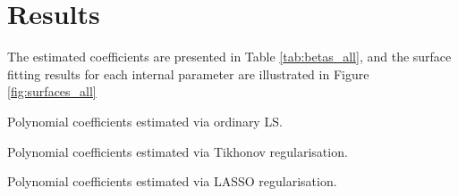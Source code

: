 \documentclass[a4paper,11pt,twoside]{article}
\def\dataset{C}
\theoremstyle{mytheoremstyle}
\begin{document}
\section{Results}
The estimated coefficients are presented in Table \ref{tab:betas_all}, and the surface fitting results for each internal parameter are illustrated in Figure \ref{fig:surfaces_all}

\begin{table}[!h]
	\centering
	\caption{Polynomial coefficients estimated via ordinary LS.}\label{tab:betas_all}
	\small
	
\end{table} 
\begin{table}[!h]
	\centering
	\caption{Polynomial coefficients estimated via Tikhonov regularisation.}\label{tab:betas_tikh}
	\small
	
\end{table}

\begin{table}[!h]
	\centering
	\caption{Polynomial coefficients estimated via LASSO regularisation.}\label{tab:betas_lass}
	\small
	
\end{table}
\end{document}
